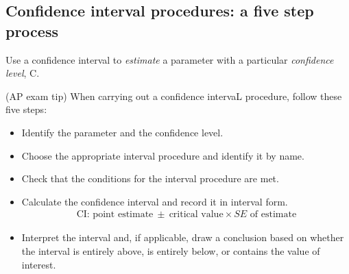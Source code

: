 

\subsection{Confidence interval procedures: a five step process}

Use a confidence interval to \emph{estimate} a parameter with a particular \emph{confidence level}, C.

\begin{onebox}{(AP exam tip) When carrying out a confidence intervaL procedure, follow these five steps:}
\begin{itemize}
\setlength{\itemsep}{0mm}
\item {}  Identify the parameter and the confidence level.
\item  {}  Choose the appropriate interval procedure and identify it by name.
\item  {}  Check that the conditions for the interval procedure are met. 
\item {} Calculate the confidence interval and record it in interval form.  
\begin{align*}
\text{CI:  point estimate}\ \pm\  \text{critical value}\times SE \text{ of estimate}
\end{align*}
\item {} Interpret the interval and, if applicable, draw a conclusion based on whether the interval is entirely above, is entirely below, or contains the value of interest.
\end{itemize}\end{onebox}



\D{\newpage}


